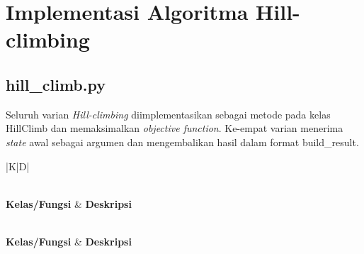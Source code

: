\section{Implementasi Algoritma Hill-climbing}

\subsection{hill\_climb.py}

Seluruh varian \textit{Hill-climbing} diimplementasikan sebagai metode pada kelas HillClimb dan memaksimalkan \textit{objective function}. Ke-empat varian menerima \textit{state} awal sebagai argumen dan mengembalikan hasil dalam format build\_result.

\begin{longtable}{|K|D|}
\caption{Kelas/fungsi pada hill\_climb.py}
\label{tab:hill-climb} \\
\hline
\textbf{Kelas/Fungsi} & \textbf{Deskripsi} \\
\hline
\endfirsthead

 \\
\hline
\textbf{Kelas/Fungsi} & \textbf{Deskripsi} \\
\hline
\endhead

\hline
{} \\
\endfoot

\hline
\endlastfoot


\end{longtable}
